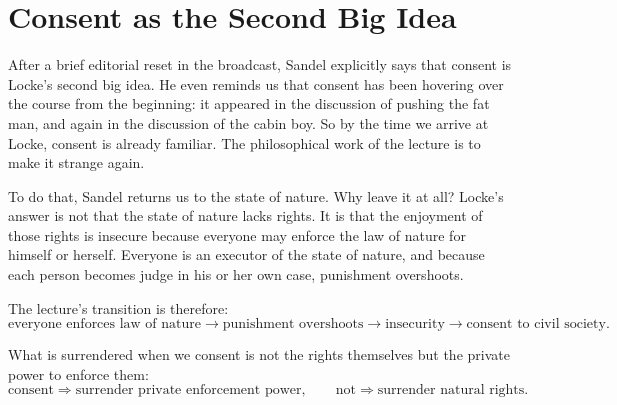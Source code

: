 \section{Consent as the Second Big Idea}

After a brief editorial reset in the broadcast, Sandel explicitly says that consent is Locke's second big idea. He even reminds us that consent has been hovering over the course from the beginning: it appeared in the discussion of pushing the fat man, and again in the discussion of the cabin boy. So by the time we arrive at Locke, consent is already familiar. The philosophical work of the lecture is to make it strange again.

To do that, Sandel returns us to the state of nature. Why leave it at all? Locke's answer is not that the state of nature lacks rights. It is that the enjoyment of those rights is insecure because everyone may enforce the law of nature for himself or herself. Everyone is an executor of the state of nature, and because each person becomes judge in his or her own case, punishment overshoots.

The lecture's transition is therefore:
\begin{equation}
\text{everyone enforces law of nature}
\to
\text{punishment overshoots}
\to
\text{insecurity}
\to
\text{consent to civil society}.
\end{equation}

What is surrendered when we consent is not the rights themselves but the private power to enforce them:
\begin{equation}
\text{consent}\Longrightarrow \text{surrender private enforcement power},
\qquad
\text{not}\Longrightarrow \text{surrender natural rights}.
\end{equation}

